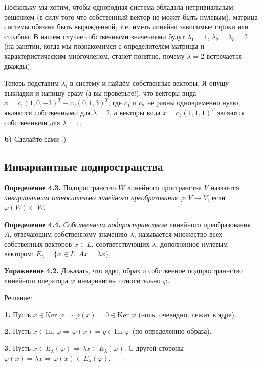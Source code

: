 \documentclass[a4paper, 12pt]{article}
\begin{document}
\begin{spacing}{1.5}
Поскольку мы хотим, чтобы однородная система обладала нетривиальным решением (в силу того что собственный вектор не может быть нулевым), матрица системы обязана быть вырожденной, т.е. иметь линейно зависимые строки или столбцы. В нашем случае собственными значениями будут $\lambda_1 = 1$, $\lambda_2 = \lambda_3 = 2$ (на занятии, когда мы познакомимся с определителем матрицы и характеристическим многочленом, станет понятно, почему $\lambda = 2$ встречается дважды).

Теперь подставим $\lambda_i$ в систему и найдём собственные векторы. Я опущу выкладки и напишу сразу (а вы проверьте!), что векторы вида $x = c_1 (1, 0, -3)^T + c_2 (0, 1, 3)^T$, где $c_1$ и $c_2$ не равны одновременно нулю, являются собственными для $\lambda = 2$, а векторы вида $x = c_3 (1, 1, 1)^T$ являются собственными для $\lambda = 1$.

\textbf{b)} Сделайте сами :)

\setlength{\leftskip}{0ex}
\setlength{\rightskip}{0ex}


\subsection*{Инвариантные подпространства}

\textbf{Определение 4.3.} Подпространство $W$ линейного пространства $V$ назвается \textit{инвариантным относительно линейного преобразования} $\varphi: V \rightarrow V$, если $\varphi(W) \subset W$.

\textbf{Определение 4.4.} \textit{Собственным подпространством} линейного преобразования $A$, отвечающим собственному значению $\lambda$, называется множество всех собственных векторов $x \in L$, соответствующих $\lambda$, дополненное нулевым вектором: $E_{\lambda} = \{ x \in L | \ Ax = \lambda x\}$.

\textbf{Упражнение 4.2.} Доказать, что ядро, образ и собственное подпространнство линейного оператора $\varphi$ инвариантны относительно $\varphi$.

\underline{Решение}:

\setlength{\leftskip}{5ex}
\setlength{\rightskip}{5ex}

\textbf{1.} Пусть $x \in \text{Ker } \varphi \Rightarrow \varphi (x) = 0 \in \text{Ker } \varphi$ (ноль, очевидно, лежит в ядре).

\textbf{2.} Пусть $x \in \text{Im } \varphi \Rightarrow \varphi (x) = y \in \text{Im } \varphi$ (по определению образа).

\textbf{3.} Пусть $x \in E_{\lambda} (\varphi) \Rightarrow \lambda x \in E_{\lambda} (\varphi)$. С другой стороны $\varphi(x) = \lambda x \Rightarrow \varphi (x) \in E_{\lambda} (\varphi)$.


\end{spacing}
\end{document}
